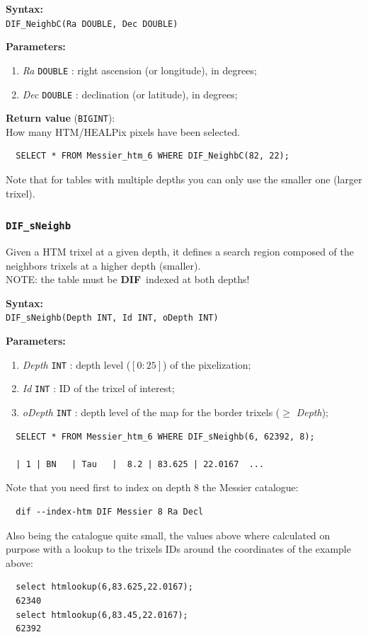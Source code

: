 \documentclass[10pt,titlepage]{article}
\newcommand{\dif}{\textbf{\small DIF}}
\newcommand{\syntax}[1]
{
  \bigskip
  \noindent
  \textbf{Syntax:} \\ 
  \indent \texttt{#1}
}
\newenvironment{parameters}
{
  \medskip
  \noindent
  \textbf{Parameters:}
  \begin{enumerate}
}
{
  \end{enumerate}
}
\newcommand{\param}[2]
{
  \item \textit{#1} \texttt{#2} 
}
\newcommand{\return}[1]
{
  \medskip
  \noindent
  \textbf{Return value} (\texttt{#1}): \\
  \indent
}
\newcommand{\example}
{
\medskip
\noindent{\textbf{Example:}}
}
\begin{document}
\syntax{DIF\_NeighbC(Ra DOUBLE, Dec DOUBLE)}

\begin{parameters}
  \param{Ra}{DOUBLE}: right ascension (or longitude), in degrees;
  \param{Dec}{DOUBLE}: declination (or latitude), in degrees;
\end{parameters}
%
\return{BIGINT} How many HTM/HEALPix pixels have been selected.
%

\example
%
\begin{verbatim}
  SELECT * FROM Messier_htm_6 WHERE DIF_NeighbC(82, 22);
\end{verbatim}
%
%
Note that for tables with multiple depths you can only use the smaller
one (larger trixel).

%
\subsubsection{{\tt DIF\_sNeighb}}
Given a HTM trixel at a given depth, it defines a search region composed of
the neighbors trixels at a higher depth (smaller). \\
NOTE: the table must be \dif\ indexed at both depths!

\syntax{DIF\_sNeighb(Depth INT, Id INT, oDepth INT)}

\begin{parameters}
  \param{Depth}{INT}: depth level ($[0:25]$) of the pixelization;
  \param{Id}{INT}: ID of the trixel of interest;
  \param{oDepth}{INT}: depth level of the map for the border trixels ($\ge$ \emph{Depth});
\end{parameters}

\example
%
\begin{verbatim}
  SELECT * FROM Messier_htm_6 WHERE DIF_sNeighb(6, 62392, 8);

  | 1 | BN   | Tau   |  8.2 | 83.625 | 22.0167  ...
\end{verbatim}

Note that you need first to index on depth 8 the Messier catalogue:
%
\begin{verbatim}
  dif --index-htm DIF Messier 8 Ra Decl
\end{verbatim}
%
Also being the catalogue quite small, the values above where calculated on
purpose with a lookup to the trixels IDs around the coordinates of the
example above:
\begin{verbatim}
  select htmlookup(6,83.625,22.0167);
  62340
  select htmlookup(6,83.45,22.0167);
  62392
\end{verbatim}
\end{document}
